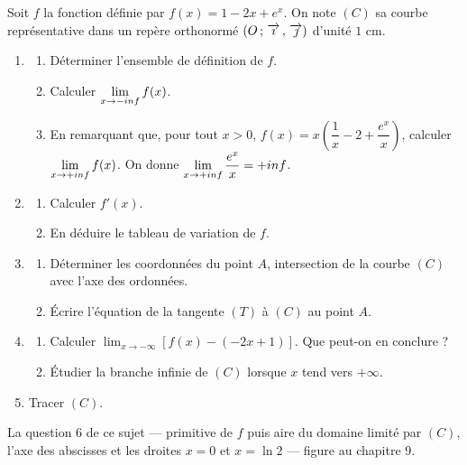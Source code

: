 \begin{commeaubac}
Soit $f$ la fonction définie par $f(x) = 1-2x+e^{x}$. On note $(C)$ sa
courbe représentative dans un repère orthonormé
$\left(O\,;\,\overrightarrow{\imath}\,,\,\overrightarrow{\jmath}\right)$ d'unité $1$ cm.

\begin{enumerate}[label=\textbf{\arabic*.}, leftmargin=*, itemsep=0.25em]
  \item \begin{enumerate}[label=\textbf{\alph*)}, leftmargin=1.4em, itemsep=0.15em]
      \item Déterminer l'ensemble de définition de $f$. 
      \item Calculer $\limminf f(x)$. 
      \item En remarquant que, pour tout $x>0$,
            $f(x) = x\left(\dfrac1x-2+\dfrac{e^{x}}{x}\right)$, calculer
            $\limpinf f(x)$. On donne $\limpinf \dfrac{e^{x}}{x} = +\infty$.
    \end{enumerate}
  \item \begin{enumerate}[label=\textbf{\alph*)}, leftmargin=1.4em, itemsep=0.15em]
      \item Calculer $f'(x)$. 
      \item En déduire le tableau de variation de $f$. 
    \end{enumerate}
  \item \begin{enumerate}[label=\textbf{\alph*)}, leftmargin=1.4em, itemsep=0.15em]
      \item Déterminer les coordonnées du point $A$, intersection de la
            courbe $(C)$ avec l'axe des ordonnées. 
      \item Écrire l'équation de la tangente $(T)$ à $(C)$ au point $A$.
    \end{enumerate}
  \item \begin{enumerate}[label=\textbf{\alph*)}, leftmargin=1.4em, itemsep=0.15em]
      \item Calculer $\displaystyle\lim_{x \to -\infty}
            \left[f(x)-(-2x+1)\right]$. Que peut-on en conclure ?
      \item Étudier la branche infinie de $(C)$ lorsque $x$ tend vers
            $+\infty$. 
    \end{enumerate}
  \item Tracer $(C)$. 
\end{enumerate}

\begin{remarque}
La question 6 de ce sujet — primitive de $f$ puis aire du domaine limité par
$(C)$, l'axe des abscisses et les droites $x = 0$ et $x = \ln2$ — figure au
chapitre 9.
\end{remarque}
\end{commeaubac}

